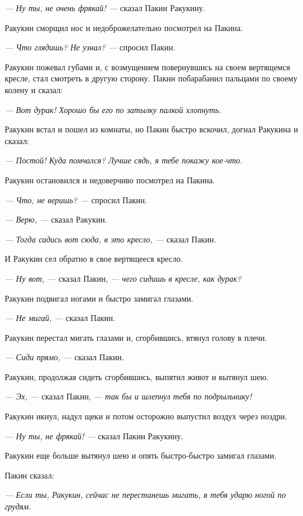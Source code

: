 


\textit{--- Ну ты, не очень фрякай! ---} сказал Пакин Ракукину.

Ракукин сморщил нос и недоброжелательно посмотрел на Пакина.

\textit{--- Что глядишь? Не узнал? ---} спросил Пакин.

Ракукин пожевал губами и, с возмущением повернувшись на своем вертящемся кресле, стал смотреть в другую сторону. Пакин побарабанил пальцами по своему колену и сказал:

\textit{--- Вот дурак! Хорошо бы его по затылку палкой хлопнуть.}

Ракукин встал и пошел из комнаты, но Пакин быстро вскочил, догнал Ракукина и сказал:

\textit{--- Постой! Куда помчался? Лучше сядь, я тебе покажу кое-что.}

Ракукин остановился и недоверчиво посмотрел на Пакина.

\textit{--- Что, не веришь? ---} спросил Пакин.

\textit{--- Верю, ---} сказал Ракукин.

\textit{--- Тогда садись вот сюда, в это кресло, ---} сказал Пакин.

И Ракукин сел обратно в свое вертящееся кресло.

\textit{--- Ну вот, ---} сказал Пакин, \textit{--- чего сидишь в кресле, как дурак?}

Ракукин подвигал ногами и быстро замигал глазами.

\textit{--- Не мигай, ---} сказал Пакин.

Ракукин перестал мигать глазами и, сгорбившись, втянул голову в плечи.

\textit{--- Сиди прямо, ---} сказал Пакин.

Ракукин, продолжая сидеть сгорбившись, выпятил живот и вытянул шею.

\textit{--- Эх, ---} сказал Пакин, \textit{--- так бы и шлепнул тебя по подрыльнику!}

Ракукин икнул, надул щеки и потом осторожно выпустил воздух через ноздри.

\textit{--- Ну ты, не фрякай! ---} сказал Пакин Ракукину.

Ракукин еще больше вытянул шею и опять быстро-быстро замигал глазами.

Пакин сказал:

\textit{--- Если ты, Ракукин, сейчас не перестанешь мигать, я тебя ударю ногой по грудям.}

